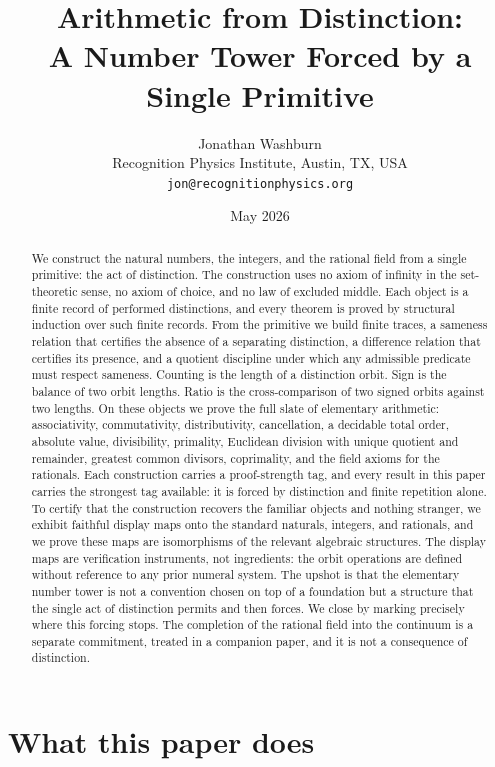 \documentclass[11pt,a4paper]{article}
\title{%
  Arithmetic from Distinction:\\
  A Number Tower Forced by a Single Primitive}
\author{%
  Jonathan Washburn\\
  Recognition Physics Institute, Austin, TX, USA\\
  \texttt{jon@recognitionphysics.org}}
\date{May 2026}
\theoremstyle{definition}
\theoremstyle{remark}
\begin{document}
\maketitle

\begin{abstract}\sloppy
We construct the natural numbers, the integers, and the rational field from a
single primitive: the act of distinction. The construction uses no axiom of
infinity in the set-theoretic sense, no axiom of choice, and no law of excluded
middle. Each object is a finite record of performed distinctions, and every
theorem is proved by structural induction over such finite records. From the
primitive we build finite traces, a sameness relation that certifies the
absence of a separating distinction, a difference relation that certifies its
presence, and a quotient discipline under which any admissible predicate must
respect sameness. Counting is the length of a distinction orbit. Sign is the
balance of two orbit lengths. Ratio is the cross-comparison of two signed
orbits against two lengths. On these objects we prove the full slate of
elementary arithmetic: associativity, commutativity, distributivity,
cancellation, a decidable total order, absolute value, divisibility, primality,
Euclidean division with unique quotient and remainder, greatest common divisors,
coprimality, and the field axioms for the rationals. Each construction carries
a proof-strength tag, and every result in this paper carries the strongest tag
available: it is forced by distinction and finite repetition alone. To certify
that the construction recovers the familiar objects and nothing stranger, we
exhibit faithful display maps onto the standard naturals, integers, and
rationals, and we prove these maps are isomorphisms of the relevant algebraic
structures. The display maps are verification instruments, not ingredients:
the orbit operations are defined without reference to any prior numeral system.
The upshot is that the elementary number tower is not a convention chosen on
top of a foundation but a structure that the single act of distinction permits
and then forces. We close by marking precisely where this forcing stops. The
completion of the rational field into the continuum is a separate commitment,
treated in a companion paper, and it is not a consequence of distinction.
\end{abstract}

\tableofcontents

\section{What this paper does}\label{sec:intro}
\end{document}
